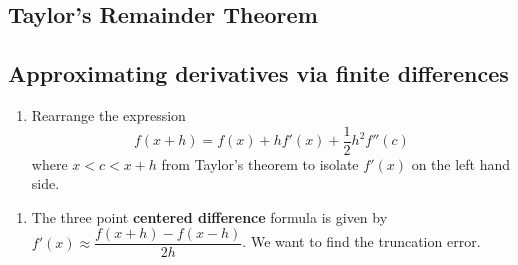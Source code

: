 \documentclass[12pt,letterpaper,noanswers]{exam}
\begin{document}
\subsection*{Taylor's Remainder Theorem}


\subsection*{Approximating derivatives via finite differences}

\begin{enumerate}[resume=classQ]
\item Rearrange the expression 
\[f(x+h) = f(x) + hf'(x) + \frac{1}{2}h^2 f''(c)\] where $x< c< x+h$
from Taylor's theorem to isolate $f'(x)$ on the left hand side.
\vspace{1in}

\end{enumerate}


\begin{enumerate}[resume=classQ]
\item The three point \textbf{centered difference} formula is given by $f'(x) \approx \dfrac{f(x+h)-f(x-h)}{2h}$.  We want to find the truncation error.
\end{enumerate}
\end{document}
